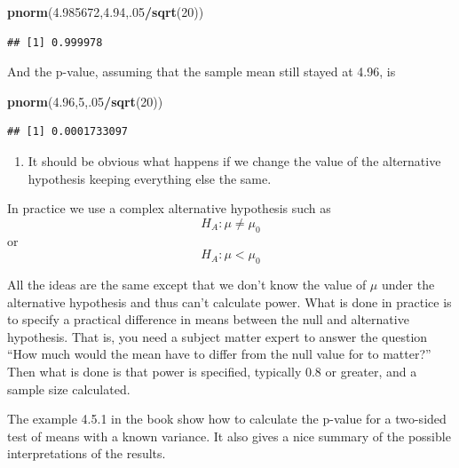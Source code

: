 \documentclass[]{book}
\newenvironment{Shaded}{\begin{snugshade}}{\end{snugshade}}
\newcommand{\KeywordTok}[1]{\textcolor[rgb]{0.13,0.29,0.53}{\textbf{#1}}}
\newcommand{\DecValTok}[1]{\textcolor[rgb]{0.00,0.00,0.81}{#1}}
\newcommand{\FloatTok}[1]{\textcolor[rgb]{0.00,0.00,0.81}{#1}}
\newcommand{\OperatorTok}[1]{\textcolor[rgb]{0.81,0.36,0.00}{\textbf{#1}}}
\newcommand{\NormalTok}[1]{#1}
\providecommand{\tightlist}{%
  \setlength{\itemsep}{0pt}\setlength{\parskip}{0pt}}
\theoremstyle{definition}
\theoremstyle{definition}
\theoremstyle{definition}
\theoremstyle{remark}
\begin{document}
\begin{Shaded}
\begin{Highlighting}[]
\KeywordTok{pnorm}\NormalTok{(}\FloatTok{4.985672}\NormalTok{,}\FloatTok{4.94}\NormalTok{,.}\DecValTok{05}\OperatorTok{/}\KeywordTok{sqrt}\NormalTok{(}\DecValTok{20}\NormalTok{))}
\end{Highlighting}
\end{Shaded}

\begin{verbatim}
## [1] 0.999978
\end{verbatim}

And the p-value, assuming that the sample mean still stayed at 4.96, is

\begin{Shaded}
\begin{Highlighting}[]
\KeywordTok{pnorm}\NormalTok{(}\FloatTok{4.96}\NormalTok{,}\DecValTok{5}\NormalTok{,.}\DecValTok{05}\OperatorTok{/}\KeywordTok{sqrt}\NormalTok{(}\DecValTok{20}\NormalTok{))}
\end{Highlighting}
\end{Shaded}

\begin{verbatim}
## [1] 0.0001733097
\end{verbatim}

\begin{enumerate}
\def\labelenumi{\arabic{enumi}.}
\setcounter{enumi}{2}
\tightlist
\item
  It should be obvious what happens if we change the value of the
  alternative hypothesis keeping everything else the same.
\end{enumerate}

In practice we use a complex alternative hypothesis such as
\[H_{A}: \mu \neq \mu_{0}\] or \[H_{A}: \mu < \mu_{0}\]

All the ideas are the same except that we don't know the value of
\(\mu\) under the alternative hypothesis and thus can't calculate power.
What is done in practice is to specify a practical difference in means
between the null and alternative hypothesis. That is, you need a subject
matter expert to answer the question ``How much would the mean have to
differ from the null value for to matter?'' Then what is done is that
power is specified, typically 0.8 or greater, and a sample size
calculated.

The example 4.5.1 in the book show how to calculate the p-value for a
two-sided test of means with a known variance. It also gives a nice
summary of the possible interpretations of the results.
\end{document}
